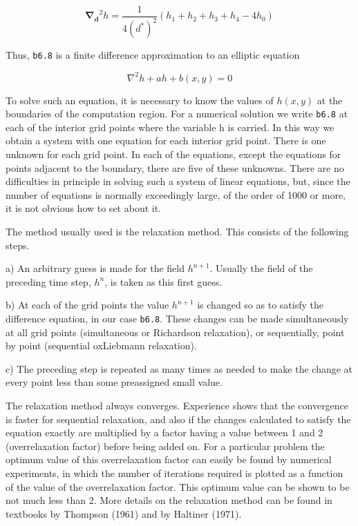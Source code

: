 \[\mathbf{\nabla_d}^2 h = \frac{1}{4(d^*)^2}\left( h_{1} + h_{2} + h_{3} + h_{4} - 4h_{0} \right)\]

Thus, \texttt{b6.8} is a finite difference approximation to an elliptic
equation

\[\nabla^{2}h + ah + b\left( x,y \right) = 0\]

To solve such an equation, it is necessary to know the values of
\(h(x,y)\) at the boundaries of the computation region. For a numerical
solution we write \texttt{b6.8} at each of the interior grid points
where the variable h is carried. In this way we obtain a system with one
equation for each interior grid point. There is one unknown for each
grid point. In each of the equations, except the equations for points
adjacent to the boundary, there are five of these unknowns. There are no
difficulties in principle in solving such a system of linear equations,
but, since the number of equations is normally exceedingly large, of the
order of 1000 or more, it is not obvious how to set about it.

The method usually used is the relaxation method. This consists of the
following steps.

a) An arbitrary guess is made for the field \(h^{n + 1}\). Usually the
field of the preceding time step, \(h^{n}\), is taken as this first
guess.

b) At each of the grid points the value \(h^{n + 1}\) is changed so as
to satisfy the difference equation, in our case \texttt{b6.8}. These
changes can be made simultaneously at all grid points (simultaneous or
Richardson relaxation), or sequentially, point by point (sequential
oxLiebmann relaxation).

c) The preceding step is repeated as many times as needed to make the
change at every point less than some preassigned small value.

The relaxation method always converges. Experience shows that the
convergence is faster for sequential relaxation, and also if the
changes calculated to satisfy the equation exactly are multiplied by a
factor having a value between 1 and 2 (overrelaxation factor) before
being added on. For a particular problem the optimum value of this
overrelaxation factor can easily be found by numerical experiments, in
which the number of iterations required is plotted as a function of the
value of the overrelaxation factor. This optimum value can be shown to
be not much less than 2. More details on the relaxation method can be
found in textbooks by Thompson (1961) and by Haltiner (1971).

